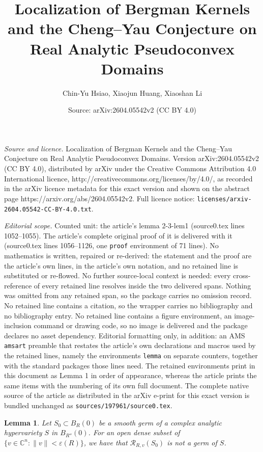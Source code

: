 \documentclass[10pt,a4paper]{amsart}
\title{Localization of Bergman Kernels and the Cheng--Yau Conjecture on Real Analytic Pseudoconvex Domains}
\author{Chin-Yu Hsiao, Xiaojun Huang, Xiaoshan Li}
\date{Source: arXiv:2604.05542v2 (CC BY 4.0)}
\newtheorem{lemma}{Lemma}
\begin{document}
\maketitle

\noindent\emph{Source and licence.} Localization of Bergman Kernels and the Cheng--Yau Conjecture on Real Analytic Pseudoconvex Domains. Version arXiv:2604.05542v2 (CC BY 4.0), distributed by arXiv under the Creative Commons Attribution 4.0 International licence, http://creativecommons.org/licenses/by/4.0/, as recorded in the arXiv licence metadata for this exact version and shown on the abstract page https://arxiv.org/abs/2604.05542v2. Full licence notice: \texttt{licenses/arxiv-2604.05542-CC-BY-4.0.txt}.\par\smallskip

\noindent\textit{Editorial scope.} Counted unit: the article's lemma 2-3-lem1 (source0.tex lines 1052--1055). The article's complete original proof of it is delivered with it (source0.tex lines 1056--1126, one \texttt{proof} environment of 71 lines). No mathematics is written, repaired or re-derived: the statement and the proof are the article's own lines, in the article's own notation, and no retained line is substituted or re-flowed.  No further source-local context is needed: every cross-reference of every retained line resolves inside the two delivered spans.  Nothing was omitted from any retained span, so the package carries no omission record.  No retained line contains a citation, so the wrapper carries no bibliography and no bibliography entry.  No retained line contains a figure environment, an image-inclusion command or drawing code, so no image is delivered and the package declares no asset dependency.  Editorial formatting only, in addition: an AMS \texttt{amsart} preamble that restates the article's own declarations and macros used by the retained lines, namely the environments \texttt{lemma} on separate counters, together with the standard packages those lines need.  The retained environments print in this document as Lemma 1 in order of appearance, whereas the article prints the same items with the numbering of its own full document.  The complete native source of the article as distributed in the arXiv e-print for this exact version is bundled unchanged as \texttt{sources/197961/source0.tex}.
\begin{lemma}\label{2-3-lem1}
Let $S_0\subset B_R(0)$ be a smooth germ of a complex analytic  hypervariety $S$ in $B_{R''}(0)$.
    For an open dense subset of $\{v\in\mathbb C ^{n}: \|v\|<\varepsilon(R)\}$, we have that $\mathcal R_{R, v}(S_0)$ is not a germ of $S$.
\end{lemma}
\end{document}
